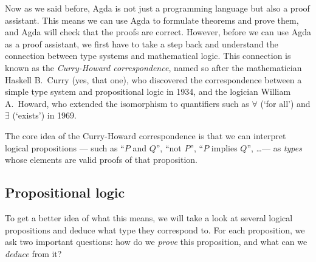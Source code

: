 \documentclass[a4paper,UKenglish]{tufte-handout}
\theoremstyle{definition}
\begin{document}
Now as we said before, Agda is not just a programming language but
also a proof assistant. This means we can use Agda to formulate
theorems and prove them, and Agda will check that the proofs are
correct. However, before we can use Agda as a proof assistant, we
first have to take a step back and understand the connection between
type systems and mathematical logic. This connection is known as the
\emph{Curry-Howard correspondence}, named so after the mathematician
Haskell B.~Curry (yes, that one), who discovered the correspondence
between a simple type system and propositional logic in 1934, and the
logician William A.~Howard, who extended the isomorphism to
quantifiers such as $\forall$ (`for all') and $\exists$ (`exists') in
1969.

The core idea of the Curry-Howard correspondence is that we can
interpret logical propositions --- such as ``$P$ and $Q$'', ``not $P$'',
``$P$ implies $Q$'', \ldots --- as \emph{types} whose elements are valid
proofs of that proposition.

\subsection{Propositional logic}

To get a better idea of what this means, we will take a look at
several logical propositions and deduce what type they correspond
to. For each proposition, we ask two important questions: how do we
\emph{prove} this proposition, and what can we \emph{deduce} from it?
\end{document}
